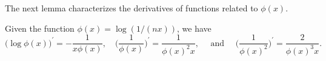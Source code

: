 %
The next lemma characterizes the derivatives of functions related to $\phi(x)$. 


\begin{lemma}
\label{lem: Derivative of phi}
Given the function $\phi(x) = \log (1/(nx))$, we have 
\[
 \big(\log \phi (x)\big)^\prime  = - \frac{1}{x \phi(x)}, \quad \bigg( \frac{1}{\phi(x)}\bigg)^\prime  = \frac{1}{\phi(x)^2 x}, \quad \text{ and } \quad \bigg( \frac{1}{\phi(x)^2}\bigg)^\prime  = \frac{2}{\phi(x)^3 x}.
\] 
\end{lemma}



